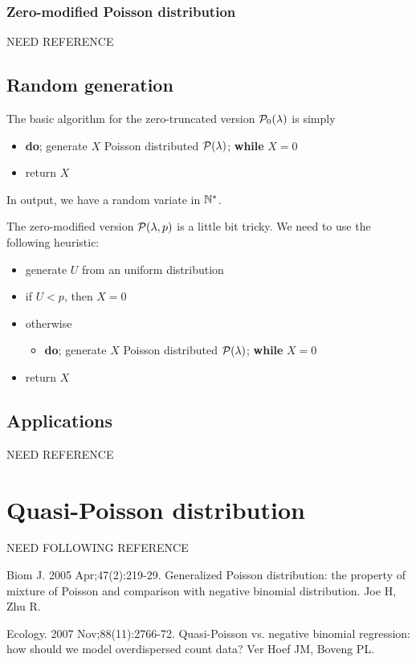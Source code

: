 \subsubsection{Zero-modified Poisson distribution}
NEED REFERENCE

\subsection{Random generation}
The basic algorithm for the zero-truncated version $\mathcal P_0(\lambda)$ is simply
\begin{itemize}
\item \textbf{do}; generate $X$ Poisson distributed $\mathcal P(\lambda)$; \textbf{while} $X=0$
\item return $X$	
\end{itemize}
In output, we have a random variate in $\mathbb N^*$.

The zero-modified version $\mathcal P(\lambda, p)$ is a little bit tricky. We need to use the following heuristic:
\begin{itemize}
\item generate $U$ from an uniform distribution
\item if $U< p$, then $X=0$
\item otherwise 
	\begin{itemize}
	\item \textbf{do}; generate $X$ Poisson distributed $\mathcal P(\lambda)$; \textbf{while} $X=0$
	\end{itemize}
\item return $X$	
\end{itemize}

\subsection{Applications}
NEED REFERENCE

\section{Quasi-Poisson distribution}
NEED FOLLOWING REFERENCE

Biom J. 2005 Apr;47(2):219-29.
    Generalized Poisson distribution: the property of mixture of Poisson and comparison with negative binomial distribution.
    Joe H, Zhu R.

    
Ecology. 2007 Nov;88(11):2766-72.
    Quasi-Poisson vs. negative binomial regression: how should we model overdispersed count data?
    Ver Hoef JM, Boveng PL.

